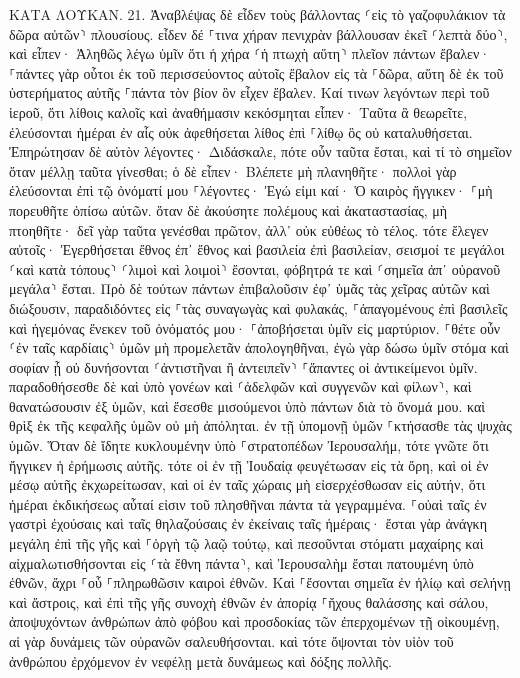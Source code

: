 \documentclass[twoside, 9pt]{extreport}
\begin{document}
ΚΑΤΑ ΛΟΥΚΑΝ.
21.
Ἀναβλέψας δὲ εἶδεν τοὺς βάλλοντας ⸂εἰς τὸ γαζοφυλάκιον τὰ δῶρα αὐτῶν⸃ πλουσίους. 
εἶδεν δέ ⸀τινα χήραν πενιχρὰν βάλλουσαν ἐκεῖ ⸂λεπτὰ δύο⸃, 
καὶ εἶπεν· Ἀληθῶς λέγω ὑμῖν ὅτι ἡ χήρα ⸂ἡ πτωχὴ αὕτη⸃ πλεῖον πάντων ἔβαλεν· 
⸀πάντες γὰρ οὗτοι ἐκ τοῦ περισσεύοντος αὐτοῖς ἔβαλον εἰς τὰ ⸀δῶρα, αὕτη δὲ ἐκ τοῦ ὑστερήματος αὐτῆς ⸀πάντα τὸν βίον ὃν εἶχεν ἔβαλεν. 
Καί τινων λεγόντων περὶ τοῦ ἱεροῦ, ὅτι λίθοις καλοῖς καὶ ἀναθήμασιν κεκόσμηται εἶπεν· 
Ταῦτα ἃ θεωρεῖτε, ἐλεύσονται ἡμέραι ἐν αἷς οὐκ ἀφεθήσεται λίθος ἐπὶ ⸀λίθῳ ὃς οὐ καταλυθήσεται. 
Ἐπηρώτησαν δὲ αὐτὸν λέγοντες· Διδάσκαλε, πότε οὖν ταῦτα ἔσται, καὶ τί τὸ σημεῖον ὅταν μέλλῃ ταῦτα γίνεσθαι; 
ὁ δὲ εἶπεν· Βλέπετε μὴ πλανηθῆτε· πολλοὶ γὰρ ἐλεύσονται ἐπὶ τῷ ὀνόματί μου ⸀λέγοντες· Ἐγώ εἰμι καί· Ὁ καιρὸς ἤγγικεν· ⸀μὴ πορευθῆτε ὀπίσω αὐτῶν. 
ὅταν δὲ ἀκούσητε πολέμους καὶ ἀκαταστασίας, μὴ πτοηθῆτε· δεῖ γὰρ ταῦτα γενέσθαι πρῶτον, ἀλλ᾽ οὐκ εὐθέως τὸ τέλος. 
τότε ἔλεγεν αὐτοῖς· Ἐγερθήσεται ἔθνος ἐπ᾽ ἔθνος καὶ βασιλεία ἐπὶ βασιλείαν, 
σεισμοί τε μεγάλοι ⸂καὶ κατὰ τόπους⸃ ⸂λιμοὶ καὶ λοιμοὶ⸃ ἔσονται, φόβητρά τε καὶ ⸂σημεῖα ἀπ᾽ οὐρανοῦ μεγάλα⸃ ἔσται. 
Πρὸ δὲ τούτων πάντων ἐπιβαλοῦσιν ἐφ᾽ ὑμᾶς τὰς χεῖρας αὐτῶν καὶ διώξουσιν, παραδιδόντες εἰς ⸀τὰς συναγωγὰς καὶ φυλακάς, ⸀ἀπαγομένους ἐπὶ βασιλεῖς καὶ ἡγεμόνας ἕνεκεν τοῦ ὀνόματός μου· 
⸀ἀποβήσεται ὑμῖν εἰς μαρτύριον. 
⸀θέτε οὖν ⸂ἐν ταῖς καρδίαις⸃ ὑμῶν μὴ προμελετᾶν ἀπολογηθῆναι, 
ἐγὼ γὰρ δώσω ὑμῖν στόμα καὶ σοφίαν ᾗ οὐ δυνήσονται ⸂ἀντιστῆναι ἢ ἀντειπεῖν⸃ ⸀ἅπαντες οἱ ἀντικείμενοι ὑμῖν. 
παραδοθήσεσθε δὲ καὶ ὑπὸ γονέων καὶ ⸂ἀδελφῶν καὶ συγγενῶν καὶ φίλων⸃, καὶ θανατώσουσιν ἐξ ὑμῶν, 
καὶ ἔσεσθε μισούμενοι ὑπὸ πάντων διὰ τὸ ὄνομά μου. 
καὶ θρὶξ ἐκ τῆς κεφαλῆς ὑμῶν οὐ μὴ ἀπόληται. 
ἐν τῇ ὑπομονῇ ὑμῶν ⸀κτήσασθε τὰς ψυχὰς ὑμῶν. 
Ὅταν δὲ ἴδητε κυκλουμένην ὑπὸ ⸀στρατοπέδων Ἰερουσαλήμ, τότε γνῶτε ὅτι ἤγγικεν ἡ ἐρήμωσις αὐτῆς. 
τότε οἱ ἐν τῇ Ἰουδαίᾳ φευγέτωσαν εἰς τὰ ὄρη, καὶ οἱ ἐν μέσῳ αὐτῆς ἐκχωρείτωσαν, καὶ οἱ ἐν ταῖς χώραις μὴ εἰσερχέσθωσαν εἰς αὐτήν, 
ὅτι ἡμέραι ἐκδικήσεως αὗταί εἰσιν τοῦ πλησθῆναι πάντα τὰ γεγραμμένα. 
⸀οὐαὶ ταῖς ἐν γαστρὶ ἐχούσαις καὶ ταῖς θηλαζούσαις ἐν ἐκείναις ταῖς ἡμέραις· ἔσται γὰρ ἀνάγκη μεγάλη ἐπὶ τῆς γῆς καὶ ⸀ὀργὴ τῷ λαῷ τούτῳ, 
καὶ πεσοῦνται στόματι μαχαίρης καὶ αἰχμαλωτισθήσονται εἰς ⸂τὰ ἔθνη πάντα⸃, καὶ Ἰερουσαλὴμ ἔσται πατουμένη ὑπὸ ἐθνῶν, ἄχρι ⸀οὗ ⸀πληρωθῶσιν καιροὶ ἐθνῶν. 
Καὶ ⸀ἔσονται σημεῖα ἐν ἡλίῳ καὶ σελήνῃ καὶ ἄστροις, καὶ ἐπὶ τῆς γῆς συνοχὴ ἐθνῶν ἐν ἀπορίᾳ ⸀ἤχους θαλάσσης καὶ σάλου, 
ἀποψυχόντων ἀνθρώπων ἀπὸ φόβου καὶ προσδοκίας τῶν ἐπερχομένων τῇ οἰκουμένῃ, αἱ γὰρ δυνάμεις τῶν οὐρανῶν σαλευθήσονται. 
καὶ τότε ὄψονται τὸν υἱὸν τοῦ ἀνθρώπου ἐρχόμενον ἐν νεφέλῃ μετὰ δυνάμεως καὶ δόξης πολλῆς. 
\end{document}
